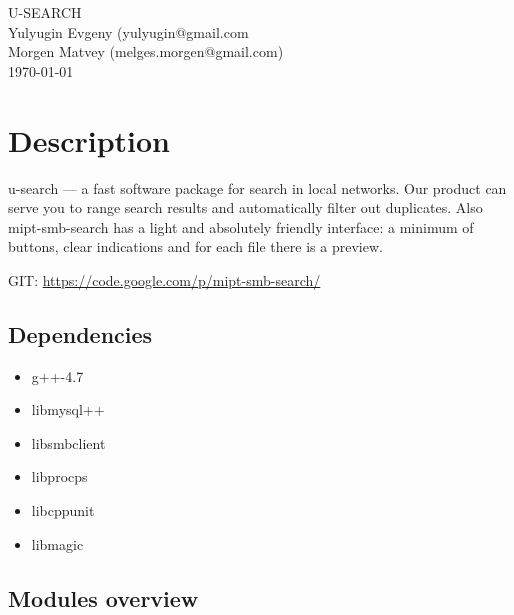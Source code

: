 \documentclass[11pt, twoside, a4paper]{book}
\begin{document}
\hypersetup{pageanchor=false, linkcolor=black, filecolor=black, citecolor=black, urlcolor=blue, pdfauthor = Evgeny Yulyugin, pdftitle=mipt-smb-search guide}

\begin{titlepage}
\vspace*{7cm}
\begin{center}
{\Large U-\/\-S\-E\-A\-R\-C\-H }\\
\vspace*{1cm}
{\large Yulyugin Evgeny (yulyugin@gmail.com}\\
{\large Morgen Matvey (melges.morgen@gmail.com)}\\
\vspace*{0.5cm}
{\small \today}\\
\end{center}
\end{titlepage}
\clearemptydoublepage
{}
\tableofcontents
\clearemptydoublepage
{}
\hypersetup{pageanchor=true,citecolor=blue}

\chapter{Description}

u-search --- a fast software package for search in local networks. Our product can serve you to range search results and automatically filter out duplicates. Also mipt-smb-search has a light and absolutely friendly interface: a minimum of buttons, clear indications and for each file there is a preview.

GIT: \url{https://code.google.com/p/mipt-smb-search/}

\section{Dependencies}

\begin{itemize}
  \item g++-4.7
  \item libmysql++
  \item libsmbclient
  \item libprocps
  \item libcppunit
  \item libmagic
\end{itemize}

\section{Modules overview}
\end{document}
